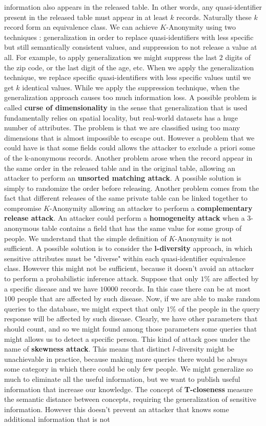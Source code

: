 information also appears in the released table. In other words, any quasi-identifier present in the released table must appear in at least $k$ records. Naturally these $k$ record form an equivalence class. We can achieve $K$-Anonymity using two techniques : generalization in order to replace quasi-identifiers with less specific but still semantically consistent values, and suppression to not release a value at all. For example, to apply generalization we might suppress the last $2$ digits of the zip code, or the last digit of the age, etc. When we apply the generalization technique, we replace specific quasi-identifiers with less specific values until we get $k$ identical values. While we apply the suppression technique, when the generalization approach causes too much information loss. A possible problem is called \textbf{curse of dimensionality} in the sense that generalization that is used fundamentally relies on spatial locality, but real-world datasets has a huge number of attributes. The problem is that we are classified using too many dimensions that is almost impossible to escape out. However a problem that we could have is that some fields could allows the attacker to exclude a priori some of the k-anonymous records. Another problem arose when the record appear in the same order in the released table and in the original table, allowing an attacker to perform an \textbf{unsorted matching attack}. A possible solution is simply to randomize the order before releasing. Another problem comes from the fact that different releases of the same private table can be linked together to compromise $K$-Anonymity allowing an attacker to perform a \textbf{complementary release attack}. An attacker could perform a \textbf{homogeneity attack} when a $3$-anonymous table contains a field that has the same value for some group of people. We understand that the simple definition of $K$-Anonymity is not sufficient. A possible solution is to consider the \textbf{l-diversity} approach, in which sensitive attributes must be "diverse" within each quasi-identifier equivalence class. However this might not be sufficient, because it doesn't avoid an attacker to perform a probabilistic inference attack. Suppose that only $1 \%$ are affected by a specific disease and we have $10000$ records. In this case there can be at most $100$ people that are affected by such disease. Now, if we are able to make random queries to the database, we might expect that only $1 \%$ of the people in the query response will be affected by such disease. Clearly, we have other parameters that should count, and so we might found among those parameters some queries that might allows us to detect a specific person. This kind of attack goes under the name of \textbf{skewness attack}. This means that distinct $l$-diversity might be unachievable in practice, because making more queries there would be always some category in which there could be only few people. We might generalize so much to eliminate all the useful information, but we want to publish useful information that increase our knowledge. The concept of \textbf{T-closeness} measure the semantic distance between concepts, requiring the generalization of sensitive information. However this doesn't prevent an attacker that knows some additional information that is not 
